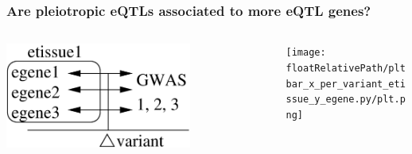 \documentclass{beamer}
\newcommand*{\floatRelativePath}{../out/gwas417/pval_5e-08/r2_0.1/kb_1000/window_1000000/75_50}%
\begin{document}
    \begin{frame}
        \frametitle{Are pleiotropic eQTLs associated to more eQTL genes?}

        \begin{columns}
            \begin{column}{0.5\textwidth}
                \begin{center}
                    \includegraphics[width=0.7\textwidth]{../presentation_230120_gold2022_paris/fig/model_pleio_egenes.png}
                \end{center}
            \end{column}
            \begin{column}{0.5\textwidth}  %
                \begin{center}
                    \texttt{[image: \\floatRelativePath/pltbar\_x\_per\_variant\_etissue\_y\_egene.py/plt.png]}
                \end{center}
            \end{column}
        \end{columns}

    \end{frame}
\end{document}
